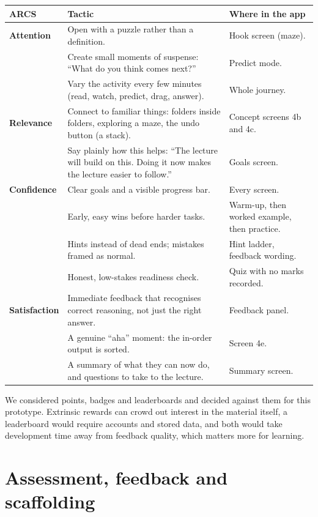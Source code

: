 \documentclass[11pt,a4paper]{article}
\begin{document}
\begin{longtable}{@{}p{2.3cm} p{6.4cm} p{6.1cm}@{}}
  \toprule
  \textbf{ARCS} & \textbf{Tactic} & \textbf{Where in the app} \\
  \midrule
  \endhead
  \textbf{Attention} & Open with a puzzle rather than a definition. & Hook screen (maze). \\
   & Create small moments of suspense: ``What do you think comes next?'' & Predict mode. \\
   & Vary the activity every few minutes (read, watch, predict, drag, answer). & Whole journey. \\
  \textbf{Relevance} & Connect to familiar things: folders inside folders, exploring a maze, the
       undo button (a stack). & Concept screens 4b and 4c. \\
   & Say plainly how this helps: ``The lecture will build on this. Doing it now makes the lecture
     easier to follow.'' & Goals screen. \\
  \textbf{Confidence} & Clear goals and a visible progress bar. & Every screen. \\
   & Early, easy wins before harder tasks. & Warm-up, then worked example, then practice. \\
   & Hints instead of dead ends; mistakes framed as normal. & Hint ladder, feedback wording. \\
   & Honest, low-stakes readiness check. & Quiz with no marks recorded. \\
  \textbf{Satisfaction} & Immediate feedback that recognises correct reasoning, not just the right
       answer. & Feedback panel. \\
   & A genuine ``aha'' moment: the in-order output is sorted. & Screen 4e. \\
   & A summary of what they can now do, and questions to take to the lecture. & Summary screen. \\
  \bottomrule
\end{longtable}

We considered points, badges and leaderboards and decided against them for this prototype.
Extrinsic rewards can crowd out interest in the material itself, a leaderboard would require
accounts and stored data, and both would take development time away from feedback quality, which
matters more for learning.

\section{Assessment, feedback and scaffolding}
\label{sec:assess}
\end{document}
